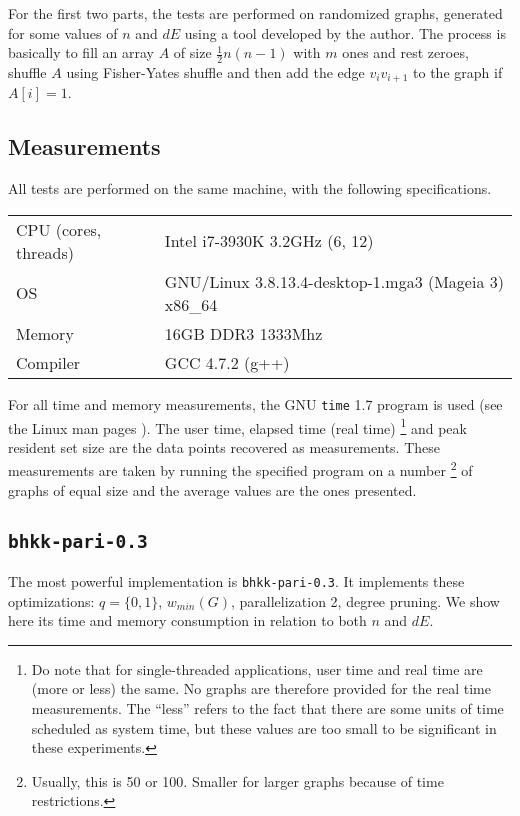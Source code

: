 \documentclass[a4paper]{article}
\newcommand{\code}{\texttt}
\begin{document}
For the first two parts, the tests are performed on randomized graphs, generated for some values of $n$ and $dE$ using a tool developed by the author. The process is basically to fill an array $A$ of size $\frac{1}{2}n(n-1)$ with $m$ ones and rest zeroes, shuffle $A$ using Fisher-Yates shuffle and then add the edge $v_iv_{i+1}$ to the graph if $A[i] = 1$.

\subsection{Measurements}
All tests are performed on the same machine, with the following specifications.

\begin{center}
\begin{tabular}{l|l}
CPU (cores, threads) & Intel i7-3930K 3.2GHz (6, 12) \\ 
OS & GNU/Linux 3.8.13.4-desktop-1.mga3 (Mageia 3) x86\_64 \\ 
Memory & 16GB DDR3 1333Mhz \\ 
Compiler & GCC 4.7.2 (g++) \\ 
\end{tabular}
\end{center}

For all time and memory measurements, the GNU \code{time} 1.7 program is used (see the Linux man pages \cite{time}). The user time, elapsed time (real time)
\footnote{Do note that for single-threaded applications, user time and real time are (more or less) the same. No graphs are therefore provided for the real time measurements. The ``less'' refers to the fact that there are some units of time scheduled as system time, but these values are too small to be significant in these experiments.}
and peak resident set size are the data points recovered as measurements. These measurements are taken by running the specified program on a number
\footnote{Usually, this is 50 or 100. Smaller for larger graphs because of time restrictions.} 
of graphs of equal size and the average values are the ones presented.

\subsection{\code{bhkk-pari-0.3}}
The most powerful implementation is \code{bhkk-pari-0.3}. It implements these optimizations: $q = \{0, 1\}$, $w_{min}(G)$, parallelization 2, degree pruning. We show here its time and memory consumption in relation to both $n$ and $dE$.
\end{document}
